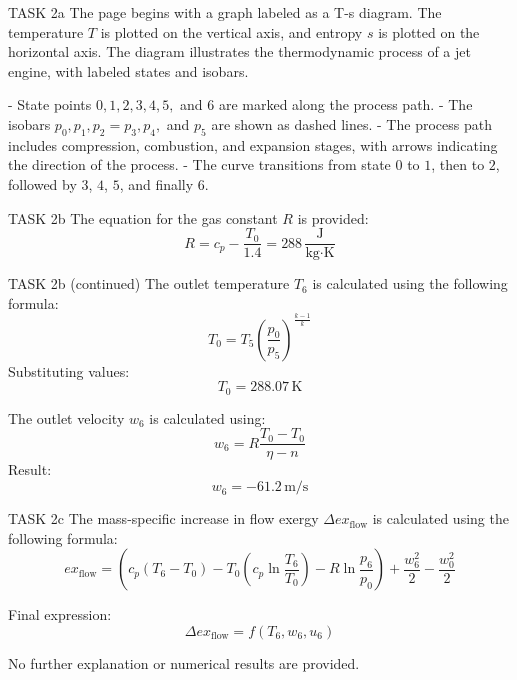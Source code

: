 TASK 2a  
The page begins with a graph labeled as a T-s diagram. The temperature \( T \) is plotted on the vertical axis, and entropy \( s \) is plotted on the horizontal axis. The diagram illustrates the thermodynamic process of a jet engine, with labeled states and isobars.  

- State points \( 0, 1, 2, 3, 4, 5, \) and \( 6 \) are marked along the process path.  
- The isobars \( p_0, p_1, p_2 = p_3, p_4, \) and \( p_5 \) are shown as dashed lines.  
- The process path includes compression, combustion, and expansion stages, with arrows indicating the direction of the process.  
- The curve transitions from state \( 0 \) to \( 1 \), then to \( 2 \), followed by \( 3 \), \( 4 \), \( 5 \), and finally \( 6 \).  

TASK 2b  
The equation for the gas constant \( R \) is provided:  
\[
R = c_p - \frac{T_0}{1.4} = 288 \, \frac{\text{J}}{\text{kg·K}}
\]  

TASK 2b (continued)  
The outlet temperature \( T_6 \) is calculated using the following formula:  
\[
T_0 = T_5 \left( \frac{p_0}{p_5} \right)^{\frac{k-1}{k}}
\]  
Substituting values:  
\[
T_0 = 288.07 \, \text{K}
\]  

The outlet velocity \( w_6 \) is calculated using:  
\[
w_6 = R \frac{T_0 - T_0}{\eta - n}
\]  
Result:  
\[
w_6 = -61.2 \, \text{m/s}
\]  

TASK 2c  
The mass-specific increase in flow exergy \( \Delta ex_{\text{flow}} \) is calculated using the following formula:  
\[
ex_{\text{flow}} = (c_p(T_6 - T_0) - T_0(c_p \ln \frac{T_6}{T_0}) - R \ln \frac{p_6}{p_0}) + \frac{w_6^2}{2} - \frac{w_0^2}{2}
\]  

Final expression:  
\[
\Delta ex_{\text{flow}} = f(T_6, w_6, u_6)
\]  

No further explanation or numerical results are provided.